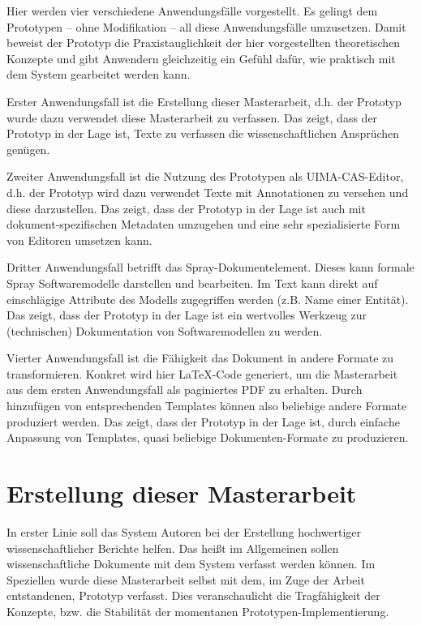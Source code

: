 Hier werden vier verschiedene Anwendungsfälle vorgestellt. Es gelingt dem Prototypen -- ohne Modifikation -- all diese Anwendungsfälle umzusetzen. Damit beweist der Prototyp die Praxistauglichkeit der hier vorgestellten theoretischen Konzepte und gibt Anwendern gleichzeitig ein Gefühl dafür, wie praktisch mit dem System gearbeitet werden kann.

 
Erster Anwendungsfall ist die Erstellung dieser Masterarbeit, d.h. der Prototyp wurde dazu verwendet diese Masterarbeit zu verfassen. Das zeigt, dass der Prototyp in der Lage ist, Texte zu verfassen die wissenschaftlichen Ansprüchen genügen.

 
Zweiter Anwendungsfall ist die Nutzung des Prototypen als UIMA-CAS-Editor, d.h. der Prototyp wird dazu verwendet Texte mit Annotationen zu versehen und diese darzustellen. Das zeigt, dass der Prototyp in der Lage ist auch mit dokument-spezifischen Metadaten umzugehen und eine sehr spezialisierte Form von Editoren umsetzen kann.

 
Dritter Anwendungsfall betrifft das Spray-Dokumentelement. Dieses kann formale Spray Softwaremodelle darstellen und bearbeiten. Im Text kann direkt auf einschlägige Attribute des Modells zugegriffen werden (z.B. Name einer Entität). Das zeigt, dass der Prototyp in der Lage ist ein wertvolles Werkzeug zur (technischen) Dokumentation von Softwaremodellen zu werden.

 
Vierter Anwendungsfall ist die Fähigkeit das Dokument in andere Formate zu transformieren. Konkret wird hier LaTeX-Code generiert, um die Masterarbeit aus dem ersten Anwendungsfall als paginiertes PDF zu erhalten. Durch hinzufügen von entsprechenden Templates können also beliebige andere Formate produziert werden. Das zeigt, dass der Prototyp in der Lage ist, durch einfache Anpassung von Templates, quasi beliebige Dokumenten-Formate zu produzieren.

 
\section{Erstellung dieser Masterarbeit}\label{wiss-dok-abschnitt}
 
In erster Linie soll das System Autoren bei der Erstellung hochwertiger wissenschaftlicher Berichte helfen. Das heißt im Allgemeinen sollen wissenschaftliche Dokumente mit dem System verfasst werden können. Im Speziellen wurde diese Masterarbeit selbst mit dem, im Zuge der Arbeit entstandenen, Prototyp verfasst. Dies veranschaulicht die Tragfähigkeit der Konzepte, bzw. die Stabilität der momentanen Prototypen-Implementierung.

